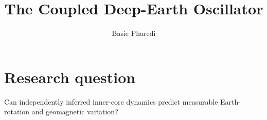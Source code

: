 \documentclass{article}
\begin{document}
\title{The Coupled Deep-Earth Oscillator}
\author{Basie Pharedi}
\section{Research question}
Can independently inferred inner-core dynamics predict measurable Earth-rotation and geomagnetic variation?
\end{document}
